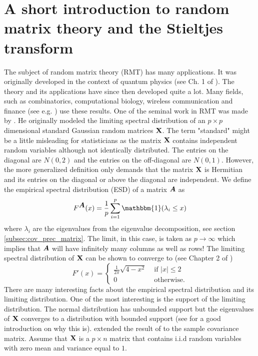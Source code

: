 \documentclass[oneside]{book}\usepackage{knitr}
\begin{document}
\section{A short introduction to random matrix theory and the Stieltjes transform}
The subject of random matrix theory (RMT) has many applications. 
It was originally developed in the context of quantum physics (see Ch. 1 of \citet{mehta2004random}). 
The theory and its applications have since then developed quite a lot. 
Many fields, such as combinatorics, computational biology, wireless communication and finance (see e.g. \citet{livan2018introduction}) use these results. 
One of the seminal work in RMT was made by \citet{wigner1967random}. 
He originally modeled the limiting spectral distribution of an $p \times p$ dimensional standard Gaussian random matrices $\mathbf{X}$.
The term "standard" might be a little misleading for statisticians as the matrix $\mathbf{X}$ contains independent random variables although not identically distributed.
The entries on the diagonal are $N(0,2)$ and the entries on the off-diagonal are $N(0,1)$.
However, the more generalized definition only demands that the matrix $\mathbf{X}$ is Hermitian and its entries on the diagonal or above the diagonal are independent. 
We define the empirical spectral distribution (ESD) of a matrix $\mbox{\boldmath$A$}$ as
$$
F^{\bA}(x)= \frac{1}{p} \sum_{i=1}^p \mathbbm{1}(\lambda_i \leq x)
$$ 
where $\lambda_i$ are the eigenvalues from the eigenvalue decomposition, see section \ref{subsec:cov_prec_matrix}. 
The limit, in this case, is taken as $p \rightarrow \infty$ which implies that $\mbox{\boldmath$A$}$ will have infinitely many columns as well as rows!
The limiting spectral distribution of $\mathbf{X}$ can be shown to converge to (see Chapter 2 of \citet{bai2010spectral})
$$
F'(x) = \begin{cases}
\frac{1}{2\pi} \sqrt{4-x^2} & \text{ if } |x|\leq 2 \\
0 & \text{ otherwise.}
\end{cases}
$$
There are many interesting facts about the empirical spectral distribution and its limiting distribution. 
One of the most interesting is the support of the limiting distribution. 
The normal distribution has unbounded support but the eigenvalues of $\mathbf{X}$ converges to a distribution with bounded support (see \citet{livan2018introduction} for a good introduction on why this is). 
\citet{marchenko1967distribution} extended the result of \citet{wigner1967random} to the sample covariance matrix. 
Assume that $\mathbf{X}$ is a $p \times n$ matrix that contains i.i.d random variables with zero mean and variance equal to $1$.
\end{document}
